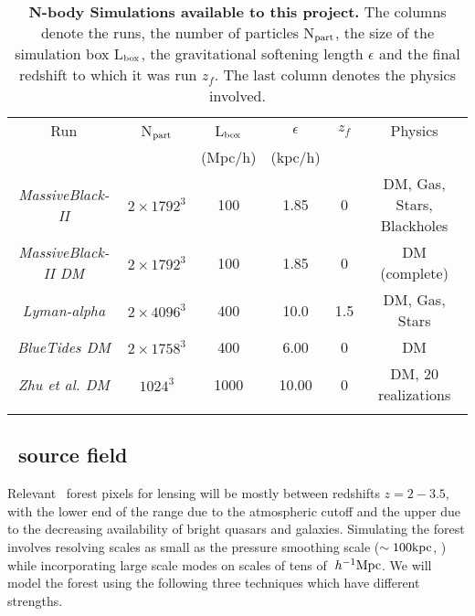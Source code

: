 \begin{table}[h]
\begin{center}
\footnotesize
\begin{tabular}{cccccc}

\hline\hline
  Run & N$_{\rm part}$   &   L$_{\rm box}$ &$\epsilon$&  $z_f$ & Physics \\
& & (Mpc/h) & (kpc/h)& & \\
  \hline
  {\it MassiveBlack-II} & $2\times 1792^3$ & 100 & 1.85 & 0 & DM, Gas, Stars, 
Blackholes\\
 {\it MassiveBlack-II  DM} & $2\times 1792^3$ & 100 & 1.85 & 0 & DM (complete)\\
\hline
  {\it Lyman-alpha} & $2\times 4096^3$ & 400 & 10.0&  1.5 & DM, Gas, 
Stars \\
{\it BlueTides DM} & $2\times 1758^3$ & 400 & 6.00 & 0 & DM  \\
{\it Zhu et al. DM} & $1024^3$ & 1000 & 10.00 & 0 & DM, 20 realizations  \\
\hline\\
\end{tabular}
\normalsize
\end{center}
\vspace{-1cm}
\caption{{\bf N-body Simulations available to this project.} 
  The columns denote the runs, the number of particles
  N$_{\rm part}$, the size of the simulation box  L$_{\rm box}$, the
  gravitational softening length $\epsilon$ and the final redshift 
to which it was run $z_f$. The
  last column denotes the physics involved. }
\label{tab_runs}
\end{table}
\vspace{-0.5cm}


\subsection{\lya\ source field}

Relevant \lya\ forest pixels for lensing will be mostly between 
 redshifts $z=2-3.5$, with the lower end of the range due to the atmospheric 
cutoff and the upper due to the decreasing availability of bright 
quasars and galaxies. Simulating the forest  involves resolving scales as
small as the pressure smoothing scale ($\sim 100 {\rm kpc}$, \cite{peeples10}) while
incorporating large scale modes on scales of tens of $\;h^{-1}{\rm Mpc}$.
We will model the forest using the following
three techniques which have different
strengths.

